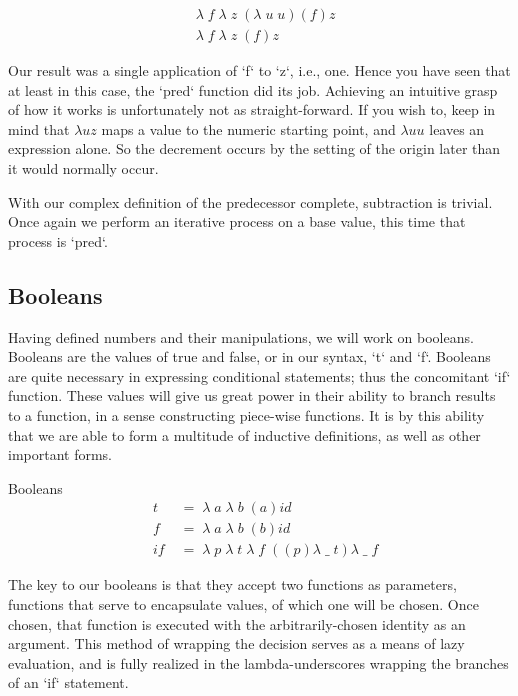\documentclass[11pt]{article}
\begin{document}
\begin{align*}
& \lambda \; f \; \lambda \; z \; (\lambda \; u \; u)(f)z
\\& \lambda \; f \; \lambda \; z \; (f)z
\end{align*}

Our result was a single application of `f` to `z`, i.e., one. Hence you have seen that at least in this case, the `pred` function did its job. Achieving an intuitive grasp of how it works is unfortunately not as straight-forward. If you wish to, keep in mind that $\lambda u z$ maps a value to the numeric starting point, and $\lambda u u$ leaves an expression alone. So the decrement occurs by the setting of the origin later than it would normally occur.

With our complex definition of the predecessor complete, subtraction is trivial. Once again we perform an iterative process on a base value, this time that process is `pred`.

\subsection{Booleans}
Having defined numbers and their manipulations, we will work on booleans. Booleans are the values of true and false, or in our syntax, `t` and `f`. Booleans are quite necessary in expressing conditional statements; thus the concomitant `if` function. These values will give us great power in their ability to branch results to a function, in a sense constructing piece-wise functions. It is by this ability that we are able to form a multitude of inductive definitions, as well as other important forms.

Booleans
\begin{align*}
& t \; &= \; \lambda \; a \; \lambda \; b \; (a)id
\\& f \; &= \; \lambda \; a \; \lambda \; b \; (b)id
\\& if \; &= \; \lambda \; p \; \lambda \; t \; \lambda \; f \; ((p)\lambda \; \_ \; t)\lambda \; \_ \; f
\end{align*}

The key to our booleans is that they accept two functions as parameters, functions that serve to encapsulate values, of which one will be chosen. Once chosen, that function is executed with the arbitrarily-chosen identity as an argument. This method of wrapping the decision serves as a means of lazy evaluation, and is fully realized in the lambda-underscores wrapping the branches of an `if` statement.
\end{document}

